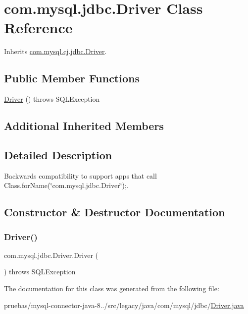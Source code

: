 \hypertarget{classcom_1_1mysql_1_1jdbc_1_1_driver}{}\section{com.\+mysql.\+jdbc.\+Driver Class Reference}
\label{classcom_1_1mysql_1_1jdbc_1_1_driver}


Inherits \mbox{\hyperlink{classcom_1_1mysql_1_1cj_1_1jdbc_1_1_driver}{com.\+mysql.\+cj.\+jdbc.\+Driver}}.

\subsection*{Public Member Functions}
\begin{DoxyCompactItemize}
\item 
\mbox{\hyperlink{classcom_1_1mysql_1_1jdbc_1_1_driver_a55d93610188df37d4699e34b19519728}{Driver}} ()  throws S\+Q\+L\+Exception 
\end{DoxyCompactItemize}
\subsection*{Additional Inherited Members}


\subsection{Detailed Description}
Backwards compatibility to support apps that call {\ttfamily Class.\+for\+Name(\char`\"{}com.\+mysql.\+jdbc.\+Driver\char`\"{});}. 

\subsection{Constructor \& Destructor Documentation}
\mbox{\label{classcom_1_1mysql_1_1jdbc_1_1_driver_a55d93610188df37d4699e34b19519728}} 
\subsubsection{\texorpdfstring{Driver()}{Driver()}}
{\footnotesize\ttfamily com.\+mysql.\+jdbc.\+Driver.\+Driver (\begin{DoxyParamCaption}{ }\end{DoxyParamCaption}) throws S\+Q\+L\+Exception}



The documentation for this class was generated from the following file\+:\begin{DoxyCompactItemize}
\item 
pruebas/mysql-\/connector-\/java-\/8../src/legacy/java/com/mysql/jdbc/\mbox{\hyperlink{legacy_2java_2com_2mysql_2jdbc_2_driver_8java}{Driver.\+java}}\end{DoxyCompactItemize}
